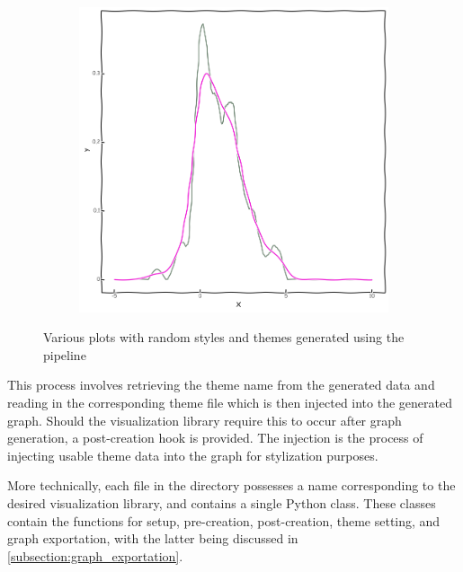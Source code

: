\begin{figure}
\begin{subfigure}[b]{0.32\textwidth}
        \includegraphics[width=\textwidth]{figures/body/procedure/kde.png}
    \end{subfigure}
    \caption{Various plots with random styles and themes generated using the pipeline}
    \label{figure:plots}
\end{figure}

This process involves retrieving the theme name from the generated data and reading in the corresponding theme file which is then injected into the generated graph. Should the visualization library require this to occur after graph generation, a post-creation hook is provided. The injection is the process of injecting usable theme data into the graph for stylization purposes. 

\hfill 

More technically, each file in the  directory possesses a name corresponding to the desired visualization library, and contains a single Python class. These  classes contain the functions for setup, pre-creation, post-creation, theme setting, and graph exportation, with the latter being discussed in \autoref{subsection:graph_exportation}.

